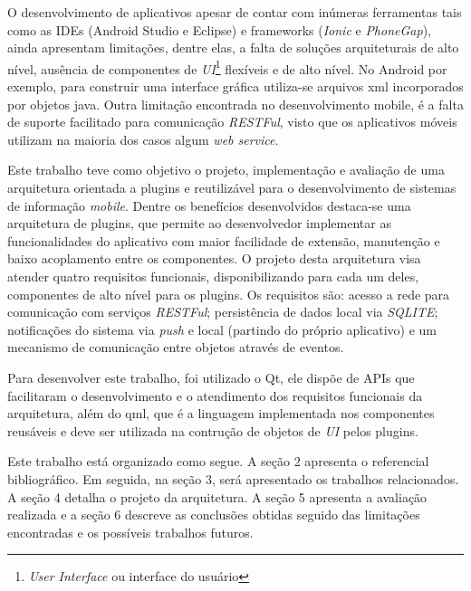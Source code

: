 O desenvolvimento de aplicativos apesar de contar com inúmeras ferramentas tais como as IDEs (Android Studio e Eclipse) e frameworks (\textit{Ionic} e \textit{PhoneGap}), ainda apresentam limitações, dentre elas, a falta de soluções arquiteturais de alto nível, ausência de componentes de \textit{UI}\footnote{\textit{User Interface} ou interface do usuário} flexíveis e de alto nível. No Android por exemplo, para construir uma interface gráfica utiliza-se arquivos xml incorporados por objetos java. Outra limitação encontrada no desenvolvimento mobile, é a falta de suporte facilitado para comunicação \textit{RESTFul}, visto que os aplicativos móveis utilizam na maioria dos casos algum \textit{web service}.


Este trabalho teve como objetivo o projeto, implementação e avaliação de uma arquitetura orientada a plugins e reutilizável para o desenvolvimento de sistemas de informação \textit{mobile}. Dentre os benefícios desenvolvidos destaca-se uma arquitetura de plugins, que permite ao desenvolvedor implementar as funcionalidades do aplicativo com maior facilidade de extensão, manutenção e baixo acoplamento entre os componentes. O projeto desta arquitetura visa atender quatro requisitos funcionais, disponibilizando para cada um deles, componentes de alto nível para os plugins. Os requisitos são: acesso a rede para comunicação com serviços \textit{RESTFul}; persistência de dados local via \textit{SQLITE}; notificações do sistema via \textit{push} e local (partindo do próprio aplicativo) e um mecanismo de comunicação entre objetos através de eventos.


Para desenvolver este trabalho, foi utilizado o Qt, ele dispõe de APIs que facilitaram o desenvolvimento e o atendimento dos requisitos funcionais da arquitetura, além do qml, que é a linguagem implementada nos componentes reusáveis e deve ser utilizada na contrução de objetos de \textit{UI} pelos plugins.


Este trabalho está organizado como segue. A seção 2 apresenta o referencial bibliográfico. Em seguida, na seção 3, será apresentado os trabalhos relacionados. A seção 4 detalha o projeto da arquitetura. A seção 5 apresenta a avaliação realizada e a seção 6 descreve as conclusões obtidas seguido das limitações encontradas e os possíveis trabalhos futuros.